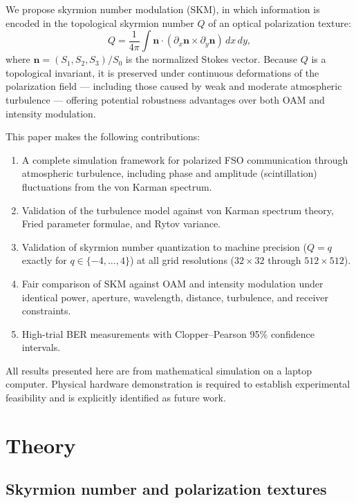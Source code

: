 \documentclass[11pt]{article}
\begin{document}
We propose skyrmion number modulation (SKM), in which information is encoded
in the topological skyrmion number $Q$ of an optical polarization texture:
\begin{equation}
Q = \frac{1}{4\pi} \int \mathbf{n} \cdot (\partial_x \mathbf{n} \times
\partial_y \mathbf{n}) \, dx \, dy,
\label{eq:skyrmion}
\end{equation}
where $\mathbf{n} = (S_1, S_2, S_3)/S_0$ is the normalized Stokes vector.
Because $Q$ is a topological invariant, it is preserved under continuous
deformations of the polarization field --- including those caused by weak and
moderate atmospheric turbulence --- offering potential robustness advantages
over both OAM and intensity modulation.

This paper makes the following contributions:
\begin{enumerate}
\item A complete simulation framework for polarized FSO communication through
atmospheric turbulence, including phase and amplitude (scintillation)
fluctuations from the von Karman spectrum.
\item Validation of the turbulence model against von Karman spectrum theory,
Fried parameter formulae, and Rytov variance.
\item Validation of skyrmion number quantization to machine precision
($Q = q$ exactly for $q \in \{-4,\dots,4\}$) at all grid resolutions
($32 \times 32$ through $512 \times 512$).
\item Fair comparison of SKM against OAM and intensity modulation under
identical power, aperture, wavelength, distance, turbulence, and receiver
constraints.
\item High-trial BER measurements with Clopper--Pearson 95\% confidence
intervals.
\end{enumerate}

All results presented here are from mathematical simulation on a laptop
computer. Physical hardware demonstration is required to establish
experimental feasibility and is explicitly identified as future work.

\section{Theory}

\subsection{Skyrmion number and polarization textures}
\end{document}
